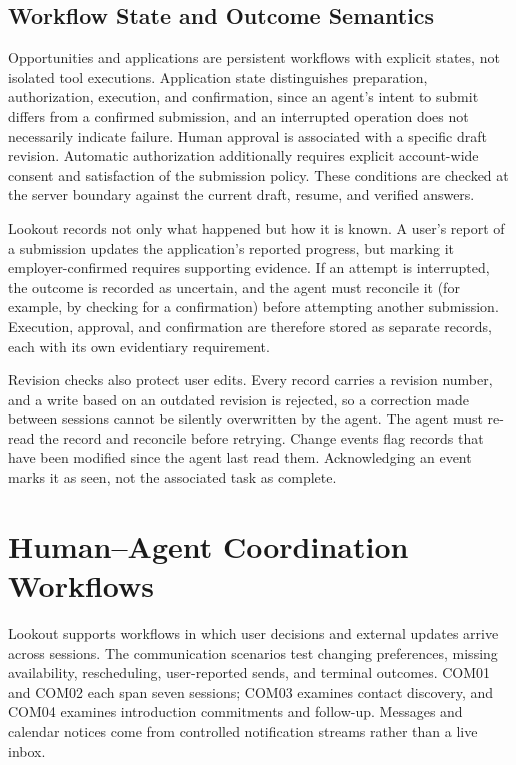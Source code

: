 \documentclass[twocolumn]{article}
\begin{document}
\subsection{Workflow State and Outcome Semantics}
Opportunities and applications are persistent workflows with explicit states, not isolated tool executions. Application state distinguishes preparation, authorization, execution, and confirmation, since an agent's intent to submit differs from a confirmed submission, and an interrupted operation does not necessarily indicate failure. Human approval is associated with a specific draft revision. Automatic authorization additionally requires explicit account-wide consent and satisfaction of the submission policy. These conditions are checked at the server boundary against the current draft, resume, and verified answers.

Lookout records not only what happened but how it is known. A user's report of a submission updates the application's reported progress, but marking it employer-confirmed requires supporting evidence. If an attempt is interrupted, the outcome is recorded as uncertain, and the agent must reconcile it (for example, by checking for a confirmation) before attempting another submission. Execution, approval, and confirmation are therefore stored as separate records, each with its own evidentiary requirement.

Revision checks also protect user edits. Every record carries a revision number, and a write based on an outdated revision is rejected, so a correction made between sessions cannot be silently overwritten by the agent. The agent must re-read the record and reconcile before retrying. Change events flag records that have been modified since the agent last read them. Acknowledging an event marks it as seen, not the associated task as complete.

\section{Human--Agent Coordination Workflows}

Lookout supports workflows in which user decisions and external updates arrive across sessions. The communication scenarios test changing preferences, missing availability, rescheduling, user-reported sends, and terminal outcomes. COM01 and COM02 each span seven sessions; COM03 examines contact discovery, and COM04 examines introduction commitments and follow-up. Messages and calendar notices come from controlled notification streams rather than a live inbox.
\end{document}
